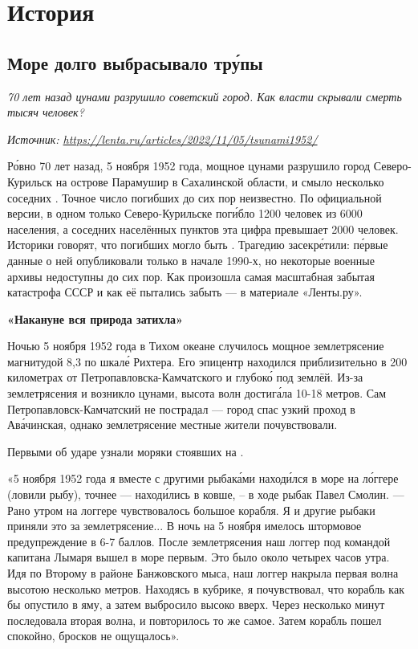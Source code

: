 \chapter{История}

\section{Море долго выбрасывало тр\'{у}пы}

\textit{70 лет назад цунами разрушило советский город. Как власти скрывали смерть тысяч человек?}

\textit{Источник: \url{https://lenta.ru/articles/2022/11/05/tsunami1952/}}

Р\'{о}вно 70 лет назад, 5 ноября 1952 года, мощное цунами разрушило город Северо-Курильск на острове Парамушир в Сахалинской области, и смыло несколько соседних . Точное число погибших до сих пор неизвестно. По официальной версии, в одном только Северо-Курильске пог\'{и}бло 1200 человек из 6000 населения, а  соседних населённых пунктов эта цифра превышает 2000 человек. Историки говорят, что погибших могло быть . Трагедию засекр\'{е}тили: п\'{е}рвые данные о ней опубликовали только в начале 1990-х, но некоторые военные архивы недоступны до сих пор. Как произошла самая масштабная забытая катастрофа СССР и как её пытались забыть --- в материале «Ленты.ру».

\textbf{«Накануне вся природа затихла»}

Ночью 5 ноября 1952 года в Тихом океане случилось мощное землетрясение магнитудой 8,3 по шкал\'{е} Рихтера. Его эпицентр находился приблизительно в 200 километрах от Петропавловска-Камчатского и глубок\'{о} под землёй. Из-за землетрясения и возникло цунами, высота волн достиг\'{а}ла 10-18 метров. Сам Петропавловск-Камчатский не пострадал --- город спас узкий проход в  Ав\'{а}чинская, однако землетрясение местные жители почувствовали.

Первыми об ударе узнали моряки стоявших на  .

«5 ноября 1952 года я вместе с другими рыбак\'{а}ми наход\'{и}лся в море на л\'{о}ггере (ловили рыбу), точнее --- наход\'{и}лись в ковше, --  в ходе  рыбак Павел Смолин. --- Рано утром на логгере чувствовалось большое  корабля. Я и другие рыбаки приняли это за землетрясение... В ночь на 5 ноября имелось штормовое предупреждение в 6-7 баллов. После землетрясения наш логгер под командой капитана Лымаря вышел в море первым. Это было около четырех часов утра. Идя по Второму  в районе Банжовского мыса, наш логгер накрыла первая волна высотою несколько метров. Находясь в кубрике, я почувствовал, что корабль как бы опустило в яму, а затем выбросило высоко вверх. Через несколько минут последовала вторая волна, и повторилось то же самое. Затем корабль пошел спокойно, бросков не ощущалось».

